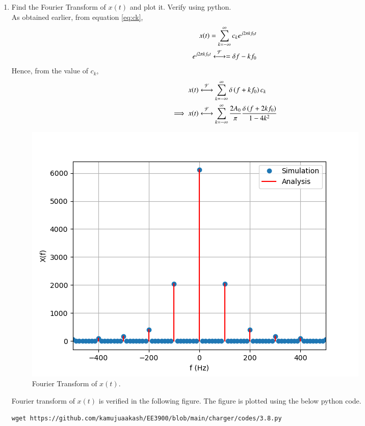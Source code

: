 \documentclass[journal,12pt,twocolumn]{IEEEtran}
\renewcommand\thesection{\arabic{section}}
\begin{document}
\begin{enumerate}[label=\thesection.\arabic*
	,ref=\thesection.\theenumi]
	\item Find the Fourier Transform of $x(t)$ and plot it. Verify using python.\\
	\solution As obtained earlier, from equation \eqref{eq:ck},
	\begin{align}
		x(t)=\sum_{k=-\infty}^{\infty}c_k e^{j2\pi k f_0 t}\\
		e^{j 2 \pi k f_0 t}\overset{\mathcal{F}}{ \longleftrightarrow}=\delta{f-kf_0}
	\end{align}
	Hence, from the value of $c_k$,
	\begin{align}
 x(t)&\overset{\mathcal{F}}{ \longleftrightarrow}\sum_{k=-\infty}^{\infty} \delta\left(f+kf_0\right) c_k\\
		\implies x(t)&\overset{\mathcal{F}}{ \longleftrightarrow}\sum_{k=-\infty}^{\infty} \frac{2A_0}{\pi} \frac{\delta\left(f+2kf_0\right)}{1-4k^2} 
	\end{align} 
	\begin{figure}[!ht]
				\includegraphics[width=\columnwidth]{figs/3.8.png}
				\caption{Fourier Transform of $x(t)$.}
				\label{fig:fourier-xt}
			\end{figure}
	Fourier transform of $x(t)$ is verified in the following figure. 
	The figure is plotted using the below python code.
	\begin{lstlisting}
wget https://github.com/kamujuaakash/EE3900/blob/main/charger/codes/3.8.py

\end{lstlisting}
\end{enumerate}
\end{document}
